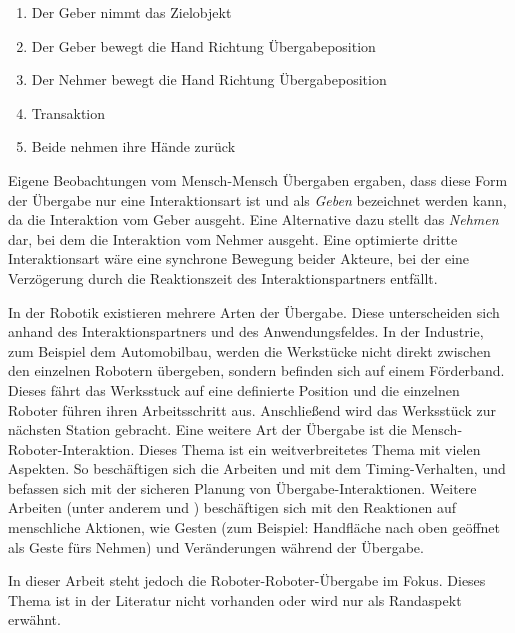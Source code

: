 \begin{enumerate}
	\item Der Geber nimmt das Zielobjekt
	\item Der Geber bewegt die Hand Richtung Übergabeposition
	\item Der Nehmer bewegt die Hand Richtung Übergabeposition
	\item Transaktion
	\item Beide nehmen ihre Hände zurück
\end{enumerate}

Eigene Beobachtungen vom Mensch-Mensch Übergaben ergaben, dass diese Form der Übergabe nur eine Interaktionsart ist und als \textit{Geben} bezeichnet werden kann, da die Interaktion vom Geber ausgeht. Eine Alternative dazu stellt das \textit{Nehmen} dar, bei dem die Interaktion vom Nehmer ausgeht. Eine optimierte dritte Interaktionsart wäre eine synchrone Bewegung beider Akteure, bei der eine Verzögerung durch die Reaktionszeit des Interaktionspartners entfällt.

In der Robotik existieren mehrere Arten der Übergabe. Diese unterscheiden sich anhand des Interaktionspartners und des Anwendungsfeldes. 
In der Industrie, zum Beispiel dem Automobilbau, werden die Werkstücke nicht direkt zwischen den einzelnen Robotern übergeben, sondern befinden sich auf einem Förderband. Dieses fährt das Werksstuck auf eine definierte Position und die einzelnen Roboter führen ihren Arbeitsschritt aus. Anschließend wird das Werksstück zur nächsten Station gebracht. Eine weitere Art der Übergabe ist die Mensch-Roboter-Interaktion. Dieses Thema ist ein weitverbreitetes Thema mit vielen Aspekten. So beschäftigen sich die Arbeiten \cite{huber2008human} und \cite{shibata1995experimental} mit dem Timing-Verhalten, \cite{mainprice2010planning} und \cite{kulic2005safe} befassen sich mit der sicheren Planung von Übergabe-Interaktionen. Weitere Arbeiten (unter anderem \cite{prada2014implementation} und \cite{basiliapproach}) beschäftigen sich mit den Reaktionen auf menschliche Aktionen, wie Gesten (zum Beispiel: Handfläche nach oben geöffnet als Geste fürs Nehmen) und Veränderungen während der Übergabe.

In dieser Arbeit steht jedoch die Roboter-Roboter-Übergabe im Fokus. Dieses Thema ist in der Literatur nicht vorhanden oder wird nur als Randaspekt erwähnt.